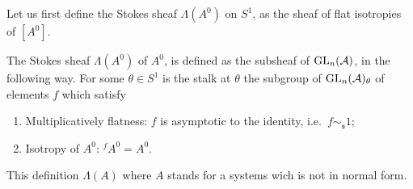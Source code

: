 Let us first define the Stokes sheaf $\Lambda(A^0)$ on $S^1$, as the sheaf of
flat isotropies of $[A^0]$.
\begin{defn}\label{defn:StokesSheaf}
  \begin{comment}
    The Stokes sheaf $\Lambda(A^0)$ of $A^0$, is the sheaf of groups defined on
    $S^1$ whose stalk at any point $\theta\in S^1$ is the group of germs of
    $f\in\Gl_n(\cO(\mathfrak{s}))$, $\mathfrak{s}$ a sector containing
    $\theta$, satisfying the conditions:
    \begin{enumerate}
      \item Flatness:
        $\underset{x\in\mathfrak{s}}{\underset{x\to0}{\lim}}f(x)=1$ and
        $f\sim_{\mathfrak{s}} 1$;
        \PROBLEM[Why two condition?]
      \item Isotropy of $A^0$: ${}^f\!A^0=A^0$.
    \end{enumerate}
  \end{comment}
  The Stokes sheaf $\Lambda(A^0)$ of $A^0$, is defined as the subsheaf of
  $\operatorname{GL}_n(\mathcal{A})$, in the following way.
  For some $\theta\in S^1$ is the stalk at $\theta$ the subgroup of
  $\operatorname{GL}_n(\mathcal{A})_\theta$ of elements $f$ which satisfy
  \begin{enumerate}
    \item Multiplicatively flatness: $f$ is asymptotic to the identity,
      i.e.\ $f\sim_{\mathfrak{s}} 1$;
    \item Isotropy of $A^0$: ${}^f\!A^0=A^0$.
  \end{enumerate}
  \begin{s-rem}
    This definition  $\Lambda(A)$ where $A$ stands
    for a systems wich is not in normal form.
  \end{s-rem}
  \begin{comment}
    \begin{s-rem}
      \PROBLEM[remove? need more defs!]
      Sabbah \cite[110]{sabbah2007isomonodromic} talks about (global)
      meromorphic connections $\sM$ on a small disk $D$ around $0$ instead of
      germs of meromorphic connections.

      Define on $S^1$ the sheaf $\Aut^{<0}(\tilde\sM^{nf})$ of automorphisms of
      $\tilde\sM^{nf}:=\cA_D\otimes_{\cO_D}\sM^{nf}$ which
      \begin{itemize}
        \item are compatible with the connection and
        \item are formally equal to the identity, i.e.\ induce the identity on
          $\hat\sM^{nf}:=\hat\cO_D\otimes_{\cO_D}\sM^{nf}$
      \end{itemize}

      The sheaf $\Aut^{<0}(\tilde\sM^{nf})$ corresponds to our $\Lambda(A^0)$.
    \end{s-rem}
  \end{comment}
\end{defn}

